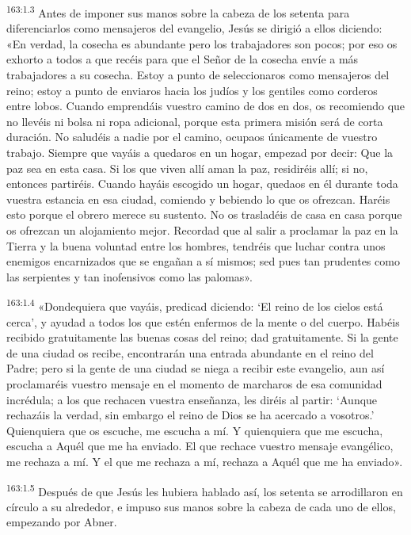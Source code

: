 \par 
\textsuperscript{163:1.3} Antes de imponer sus manos sobre la cabeza de los setenta para diferenciarlos como mensajeros del evangelio, Jesús se dirigió a ellos diciendo: «En verdad, la cosecha es abundante pero los trabajadores son pocos; por eso os exhorto a todos a que recéis para que el Señor de la cosecha envíe a más trabajadores a su cosecha. Estoy a punto de seleccionaros como mensajeros del reino; estoy a punto de enviaros hacia los judíos y los gentiles como corderos entre lobos. Cuando emprendáis vuestro camino de dos en dos, os recomiendo que no llevéis ni bolsa ni ropa adicional, porque esta primera misión será de corta duración. No saludéis a nadie por el camino, ocupaos únicamente de vuestro trabajo. Siempre que vayáis a quedaros en un hogar, empezad por decir: Que la paz sea en esta casa. Si los que viven allí aman la paz, residiréis allí; si no, entonces partiréis. Cuando hayáis escogido un hogar, quedaos en él durante toda vuestra estancia en esa ciudad, comiendo y bebiendo lo que os ofrezcan. Haréis esto porque el obrero merece su sustento. No os trasladéis de casa en casa porque os ofrezcan un alojamiento mejor. Recordad que al salir a proclamar la paz en la Tierra y la buena voluntad entre los hombres, tendréis que luchar contra unos enemigos encarnizados que se engañan a sí mismos; sed pues tan prudentes como las serpientes y tan inofensivos como las palomas».

\par 
\textsuperscript{163:1.4} «Dondequiera que vayáis, predicad diciendo: `El reino de los cielos está cerca', y ayudad a todos los que estén enfermos de la mente o del cuerpo. Habéis recibido gratuitamente las buenas cosas del reino; dad gratuitamente. Si la gente de una ciudad os recibe, encontrarán una entrada abundante en el reino del Padre; pero si la gente de una ciudad se niega a recibir este evangelio, aun así proclamaréis vuestro mensaje en el momento de marcharos de esa comunidad incrédula; a los que rechacen vuestra enseñanza, les diréis al partir: `Aunque rechazáis la verdad, sin embargo el reino de Dios se ha acercado a vosotros.' Quienquiera que os escuche, me escucha a mí. Y quienquiera que me escucha, escucha a Aquél que me ha enviado. El que rechace vuestro mensaje evangélico, me rechaza a mí. Y el que me rechaza a mí, rechaza a Aquél que me ha enviado».

\par 
\textsuperscript{163:1.5} Después de que Jesús les hubiera hablado así, los setenta se arrodillaron en círculo a su alrededor, e impuso sus manos sobre la cabeza de cada uno de ellos, empezando por Abner.

